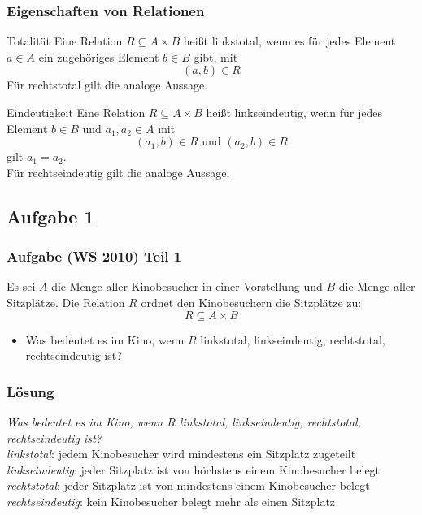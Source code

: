 \begin{frame}
	\frametitle{Eigenschaften von Relationen}
	\begin{block}{Totalität}
		Eine Relation $R \subseteq A \times B$ heißt linkstotal, wenn es für jedes Element $a \in A$ ein zugehöriges Element $b \in B$ gibt, mit $$(a,b) \in R$$ Für rechtstotal gilt die analoge Aussage.
	\end{block}
	
	\pause
	\begin{block}{Eindeutigkeit}
		Eine Relation $R \subseteq A \times B$ heißt linkseindeutig, wenn für jedes Element $b \in B$ und $a_1, a_2 \in A$ mit $$(a_1,b) \in R \text{ und } (a_2,b) \in R$$ gilt $a_1 = a_2$. \\
		Für rechtseindeutig gilt die analoge Aussage.
	\end{block}
\end{frame}

\subsection{Aufgabe 1}
\begin{frame}
	\frametitle{Aufgabe (WS 2010) Teil 1}
	Es sei $A$ die Menge aller Kinobesucher in einer Vorstellung und $B$ die Menge aller Sitzplätze. Die Relation $R$ ordnet den Kinobesuchern die Sitzplätze zu:
	$$ R \subseteq A \times B$$
	\begin{itemize}
		\item Was bedeutet es im Kino, wenn $R$ linkstotal, linkseindeutig, rechtstotal, rechtseindeutig ist?
	\end{itemize}
\end{frame}

\begin{frame}
	\frametitle{Lösung}
	\textit{Was bedeutet es im Kino, wenn $R$ linkstotal, linkseindeutig, rechtstotal, rechtseindeutig ist?} \\[2em] \pause
	\emph{linkstotal}: jedem Kinobesucher wird mindestens ein Sitzplatz zugeteilt \\ \pause
	\emph{linkseindeutig}: jeder Sitzplatz ist von höchstens einem Kinobesucher belegt \\ \pause
	\emph{rechtstotal}: jeder Sitzplatz ist von mindestens einem Kinobesucher belegt \\ \pause
	\emph{rechtseindeutig}: kein Kinobesucher belegt mehr als einen Sitzplatz \\
\end{frame}

